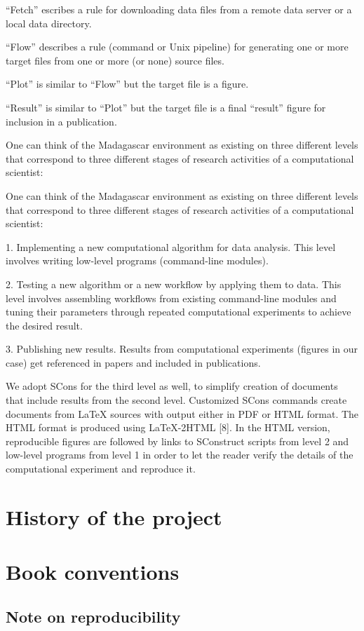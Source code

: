 ``Fetch'' escribes a rule for downloading data
files from a remote data server or a local data directory. 
 
``Flow'' describes a rule (command or Unix pipeline) for
generating one or more target files from one or more (or none) source
files.
 
``Plot'' is similar to ``Flow'' but the target file is a figure.  

``Result'' is similar to ``Plot'' but the
target file is a final ``result'' figure for inclusion
in a publication.  

One can think of the Madagascar environment as existing on three
different levels that correspond to three different stages of research
activities of a computational scientist:

One can think of the Madagascar environment as existing on three
different levels that correspond to three different stages of research
activities of a computational scientist:

1. Implementing a new computational algorithm for data analysis. This
level involves writing low-level programs (command-line modules).

2. Testing a new algorithm or a new workflow by applying them to
data. This level involves assembling workflows from existing
command-line modules and tuning their parameters through repeated
computational experiments to achieve the desired result.

3. Publishing new results. Results from computational experiments
(figures in our case) get referenced in papers and included in
publications.

We adopt SCons for the third level as well, to simplify creation of
documents that include results from the second level. Customized SCons
commands create documents from LaTeX sources with output either in PDF
or HTML format. The HTML format is produced using LaTeX-2HTML [8]. In
the HTML version, reproducible figures are followed by links to
SConstruct scripts from level 2 and low-level programs from level 1 in
order to let the reader verify the details of the computational
experiment and reproduce it.

\nocite{fomel2013madagascar}


\section{History of the project}

\section{Book conventions}

\subsection{Note on reproducibility}




